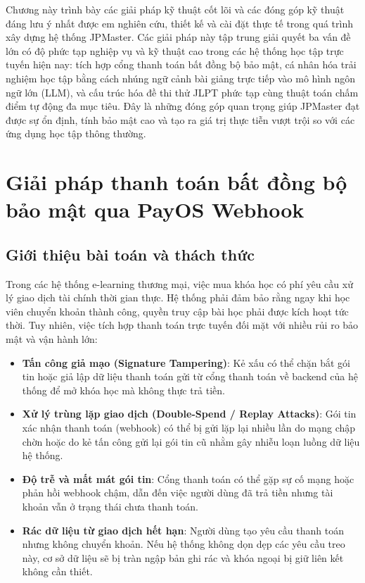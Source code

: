 \documentclass[../DoAn.tex]{subfiles}
\begin{document}
Chương này trình bày các giải pháp kỹ thuật cốt lõi và các đóng góp kỹ thuật đáng lưu ý nhất được em nghiên cứu, thiết kế và cài đặt thực tế trong quá trình xây dựng hệ thống JPMaster. Các giải pháp này tập trung giải quyết ba vấn đề lớn có độ phức tạp nghiệp vụ và kỹ thuật cao trong các hệ thống học tập trực tuyến hiện nay: tích hợp cổng thanh toán bất đồng bộ bảo mật, cá nhân hóa trải nghiệm học tập bằng cách nhúng ngữ cảnh bài giảng trực tiếp vào mô hình ngôn ngữ lớn (LLM), và cấu trúc hóa đề thi thử JLPT phức tạp cùng thuật toán chấm điểm tự động đa mục tiêu. Đây là những đóng góp quan trọng giúp JPMaster đạt được sự ổn định, tính bảo mật cao và tạo ra giá trị thực tiễn vượt trội so với các ứng dụng học tập thông thường.

\section{Giải pháp thanh toán bất đồng bộ bảo mật qua PayOS Webhook}

\subsection{Giới thiệu bài toán và thách thức}
Trong các hệ thống e-learning thương mại, việc mua khóa học có phí yêu cầu xử lý giao dịch tài chính thời gian thực. Hệ thống phải đảm bảo rằng ngay khi học viên chuyển khoản thành công, quyền truy cập bài học phải được kích hoạt tức thời. Tuy nhiên, việc tích hợp thanh toán trực tuyến đối mặt với nhiều rủi ro bảo mật và vận hành lớn:
\begin{itemize}
    \item \textbf{Tấn công giả mạo (Signature Tampering)}: Kẻ xấu có thể chặn bắt gói tin hoặc giả lập dữ liệu thanh toán gửi từ cổng thanh toán về backend của hệ thống để mở khóa học mà không thực trả tiền.
    \item \textbf{Xử lý trùng lặp giao dịch (Double-Spend / Replay Attacks)}: Gói tin xác nhận thanh toán (webhook) có thể bị gửi lặp lại nhiều lần do mạng chập chờn hoặc do kẻ tấn công gửi lại gói tin cũ nhằm gây nhiễu loạn luồng dữ liệu hệ thống.
    \item \textbf{Độ trễ và mất mát gói tin}: Cổng thanh toán có thể gặp sự cố mạng hoặc phản hồi webhook chậm, dẫn đến việc người dùng đã trả tiền nhưng tài khoản vẫn ở trạng thái chưa thanh toán.
    \item \textbf{Rác dữ liệu từ giao dịch hết hạn}: Người dùng tạo yêu cầu thanh toán nhưng không chuyển khoản. Nếu hệ thống không dọn dẹp các yêu cầu treo này, cơ sở dữ liệu sẽ bị tràn ngập bản ghi rác và khóa ngoại bị giữ liên kết không cần thiết.
\end{itemize}
\end{document}
